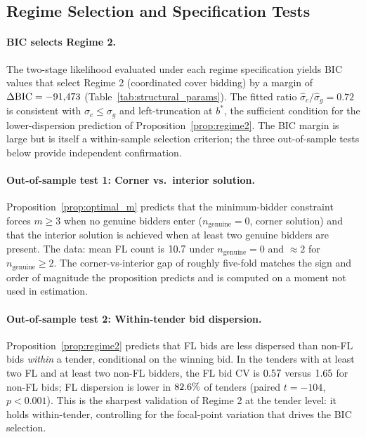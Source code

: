 \subsection{Regime Selection and Specification Tests}

\paragraph{BIC selects Regime 2.}
The two-stage likelihood evaluated under each regime
specification yields BIC values that select Regime 2
(coordinated cover bidding) by a margin of $\Delta\mathrm{BIC} =
-91{,}473$ (Table~\ref{tab:structural_params}). The fitted
ratio $\hat{\sigma}_c / \hat{\sigma}_g = 0.72$ is consistent
with $\sigma_c \leq \sigma_g$ and left-truncation at $b^*$, the
sufficient condition for the lower-dispersion prediction of
Proposition~\ref{prop:regime2}. The BIC margin is large but is
itself a within-sample selection criterion; the three
out-of-sample tests below provide independent confirmation.

\paragraph{Out-of-sample test 1: Corner vs.\ interior solution.}
Proposition~\ref{prop:optimal_m} predicts that the
minimum-bidder constraint forces $m \geq 3$ when no genuine
bidders enter ($n_{\mathrm{genuine}} = 0$, corner solution) and
that the interior solution is achieved when at least two
genuine bidders are present. The data: mean FL count is $10.7$
under $n_{\mathrm{genuine}} = 0$ and $\approx 2$ for
$n_{\mathrm{genuine}} \geq 2$. The corner-vs-interior gap of
roughly five-fold matches the sign and order of magnitude the
proposition predicts and is computed on a moment not used in
estimation.

\paragraph{Out-of-sample test 2: Within-tender bid dispersion.}
Proposition~\ref{prop:regime2} predicts that FL bids are less
dispersed than non-FL bids \emph{within} a tender, conditional
on the winning bid. In the \valFLBidEvent tenders with at least two
FL and at least two non-FL bidders, the FL bid CV is $0.57$
versus $1.65$ for non-FL bids; FL dispersion is lower in
$82.6\%$ of tenders (paired $t = -104$, $p < 0.001$). This is
the sharpest validation of Regime 2 at the tender level: it
holds within-tender, controlling for the focal-point variation
that drives the BIC selection.


